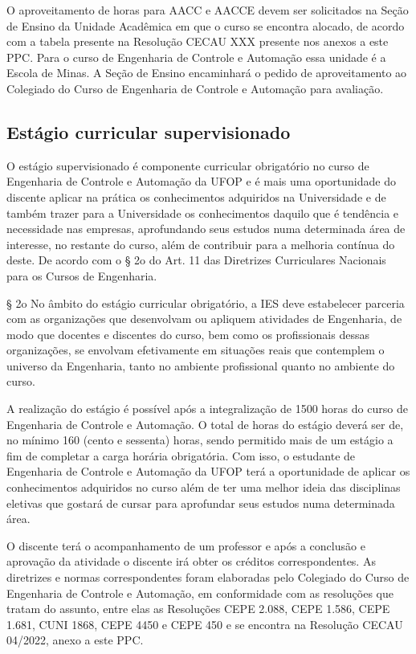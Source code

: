 \documentclass[
	12pt,				%
	openright,			%
	oneside,			%
	a4paper,			%
	english,			%
	brazil				%
	]{abntex2}
\begin{document}
O aproveitamento de horas para AACC e AACCE devem ser solicitados na Seção de Ensino da Unidade Acadêmica em que o curso se encontra alocado, de acordo com a tabela presente na Resolução CECAU XXX presente nos anexos a este PPC.  Para o curso de Engenharia de Controle e Automação essa unidade é a Escola de Minas. A Seção de Ensino encaminhará o pedido de aproveitamento ao Colegiado do Curso de Engenharia de Controle e Automação para avaliação.

\subsection{Estágio curricular supervisionado}
O estágio supervisionado é componente curricular obrigatório no curso de Engenharia de Controle e Automação da UFOP e é mais uma oportunidade do discente aplicar na prática os conhecimentos adquiridos na Universidade e de também trazer para a Universidade os conhecimentos daquilo que é tendência e necessidade nas empresas, aprofundando seus estudos numa determinada área de interesse, no restante do curso, além de contribuir para a melhoria contínua do deste. De acordo com o § 2o do Art. 11 das Diretrizes Curriculares Nacionais para os Cursos de Engenharia.

        § 2o No âmbito do estágio curricular obrigatório, a IES deve estabelecer parceria com as organizações que desenvolvam ou apliquem atividades de Engenharia, de modo que docentes e discentes do curso, bem como os profissionais dessas organizações, se envolvam efetivamente
        em situações reais que contemplem o universo da Engenharia, tanto no ambiente profissional quanto no ambiente do curso.

A realização do estágio é possível após a integralização de 1500 horas do curso de Engenharia de Controle e Automação. O total de horas do estágio deverá ser de, no mínimo 160 (cento e sessenta) horas, sendo permitido mais de um estágio a fim de completar a carga horária obrigatória.  Com isso, o estudante de Engenharia de Controle e Automação da UFOP terá a oportunidade de aplicar os conhecimentos adquiridos no curso além de ter uma melhor ideia das disciplinas eletivas que gostará de cursar para aprofundar seus estudos numa determinada área.

O discente terá o acompanhamento de um professor e após a conclusão e aprovação da atividade o discente irá obter os créditos correspondentes. As diretrizes e normas correspondentes foram elaboradas pelo Colegiado do Curso de Engenharia de Controle e Automação, em conformidade com as resoluções que tratam do assunto, entre elas as Resoluções CEPE 2.088, CEPE 1.586, CEPE 1.681, CUNI 1868, CEPE 4450 e CEPE 450 e se encontra na Resolução CECAU 04/2022, anexo a este PPC.
\end{document}
